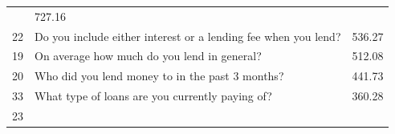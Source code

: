 \begin{longtable}[]{@{}lll@{}}
\begin{minipage}[t]{0.77\columnwidth}
\end{minipage} & \begin{minipage}[t]{0.09\columnwidth}\raggedright
727.16\strut
\end{minipage}\tabularnewline
\begin{minipage}[t]{0.05\columnwidth}\raggedright
22\strut
\end{minipage} & \begin{minipage}[t]{0.77\columnwidth}\raggedright
Do you include either interest or a lending fee when you lend?\strut
\end{minipage} & \begin{minipage}[t]{0.09\columnwidth}\raggedright
536.27\strut
\end{minipage}\tabularnewline
\begin{minipage}[t]{0.05\columnwidth}\raggedright
19\strut
\end{minipage} & \begin{minipage}[t]{0.77\columnwidth}\raggedright
On average how much do you lend in general?\strut
\end{minipage} & \begin{minipage}[t]{0.09\columnwidth}\raggedright
512.08\strut
\end{minipage}\tabularnewline
\begin{minipage}[t]{0.05\columnwidth}\raggedright
20\strut
\end{minipage} & \begin{minipage}[t]{0.77\columnwidth}\raggedright
Who did you lend money to in the past 3 months?\strut
\end{minipage} & \begin{minipage}[t]{0.09\columnwidth}\raggedright
441.73\strut
\end{minipage}\tabularnewline
\begin{minipage}[t]{0.05\columnwidth}\raggedright
33\strut
\end{minipage} & \begin{minipage}[t]{0.77\columnwidth}\raggedright
What type of loans are you currently paying of?\strut
\end{minipage} & \begin{minipage}[t]{0.09\columnwidth}\raggedright
360.28\strut
\end{minipage}\tabularnewline
\begin{minipage}[t]{0.05\columnwidth}\raggedright
23\strut
\end{minipage} & \begin{minipage}[t]{0.77\columnwidth}\raggedright

\end{minipage}
\end{longtable}
